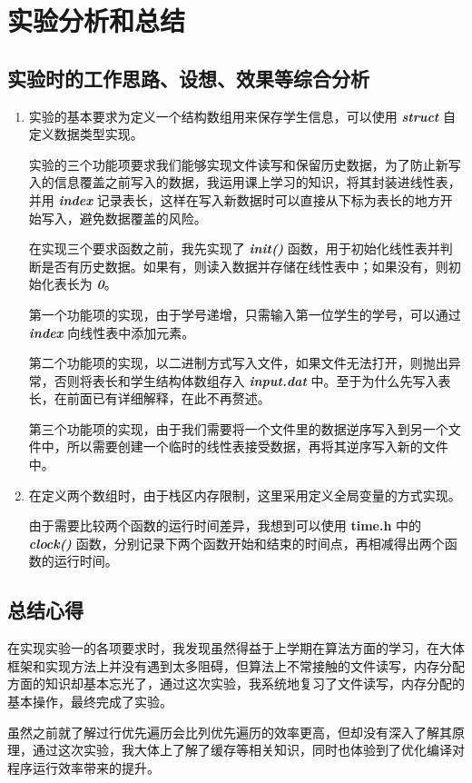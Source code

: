 \section{实验分析和总结}
    \subsection{实验时的工作思路、设想、效果等综合分析}
        \begin{enumerate}
            \item 
                \par 实验的基本要求为定义一个结构数组用来保存学生信息，可以使用 \textbf{\textit{struct}} 自定义数据类型实现。
                \par 实验的三个功能项要求我们能够实现文件读写和保留历史数据，为了防止新写入的信息覆盖之前写入的数据，我运用课上学习的知识，将其封装进线性表，并用 \textbf{\textit{index}} 记录表长，这样在写入新数据时可以直接从下标为表长的地方开始写入，避免数据覆盖的风险。
                \par 在实现三个要求函数之前，我先实现了 \textbf{\textit{init()}} 函数，用于初始化线性表并判断是否有历史数据。如果有，则读入数据并存储在线性表中；如果没有，则初始化表长为 \textbf{\textit{0}}。
                \par 第一个功能项的实现，由于学号递增，只需输入第一位学生的学号，可以通过 \textbf{\textit{index}} 向线性表中添加元素。
                \par 第二个功能项的实现，以二进制方式写入文件，如果文件无法打开，则抛出异常，否则将表长和学生结构体数组存入 \textbf{\textit{input.dat}} 中。至于为什么先写入表长，在前面已有详细解释，在此不再赘述。
                \par 第三个功能项的实现，由于我们需要将一个文件里的数据逆序写入到另一个文件中，所以需要创建一个临时的线性表接受数据，再将其逆序写入新的文件中。
            \item 
                \par 在定义两个数组时，由于栈区内存限制，这里采用定义全局变量的方式实现。
                \par 由于需要比较两个函数的运行时间差异，我想到可以使用 \textbf{time.h} 中的 \textbf{\textit{clock()}} 函数，分别记录下两个函数开始和结束的时间点，再相减得出两个函数的运行时间。
        \end{enumerate}
    \subsection{总结心得}
        \par 在实现实验一的各项要求时，我发现虽然得益于上学期在算法方面的学习，在大体框架和实现方法上并没有遇到太多阻碍，但算法上不常接触的文件读写，内存分配方面的知识却基本忘光了，通过这次实验，我系统地复习了文件读写，内存分配的基本操作，最终完成了实验。
        \par 虽然之前就了解过行优先遍历会比列优先遍历的效率更高，但却没有深入了解其原理，通过这次实验，我大体上了解了缓存等相关知识，同时也体验到了优化编译对程序运行效率带来的提升。